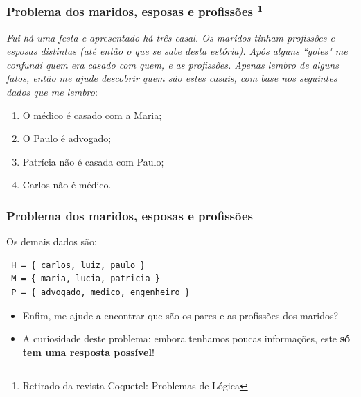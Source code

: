 \documentclass{beamer}
\begin{document}
\begin{frame}[fragile]
	\frametitle{Problema dos maridos, esposas e profissões \footnote{Retirado da revista Coquetel: Problemas de Lógica}}
	
\begin{block}{}
 \emph{Fui há uma festa e  apresentado há três casal.
 Os maridos tinham profissões  e esposas distintas (até então o que se sabe desta estória).
 Após alguns ``goles"\/ me confundi quem era casado com quem, e as profissões.
 Apenas lembro de alguns fatos, então me ajude descobrir quem
 são estes casais, com base nos seguintes dados que me lembro}:
\begin{enumerate}
 \item  O médico é casado com a Maria;
 \item  O Paulo é advogado;
 \item  Patrícia não é casada com Paulo;
  \item Carlos não é médico.
\end{enumerate}
 


\end{block}

\end{frame}


\begin{frame}[fragile]
   \frametitle{Problema dos maridos, esposas e profissões}
	
 Os demais dados são:
 \begin{verbatim}
 H = { carlos, luiz, paulo }
 M = { maria, lucia, patricia }
 P = { advogado, medico, engenheiro }
 \end{verbatim}

\pause
\begin{itemize}
\item Enfim, me ajude a encontrar que são os pares e as profissões dos maridos?

\item A curiosidade deste problema: embora tenhamos poucas informações, este \textbf{só tem uma resposta possível}!
\end{itemize}


\end{frame}





\end{document}
